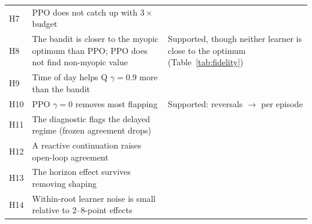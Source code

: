 \begin{table}[h]
\begin{tabular}{@{}lp{}p{}@{}}
H7 & PPO does not catch up with $3\times$ budget &  \\
H8 & The bandit is closer to the myopic optimum than PPO; PPO does not find non-myopic value & Supported, though neither learner is close to the optimum (Table~\ref{tab:fidelity}) \\
\midrule
H9 & Time of day helps Q $\gamma=0.9$ more than the bandit &  \\
H10 & PPO $\gamma=0$ removes most flapping & Supported: reversals \HPPODefaultRev{} $\rightarrow$ \HPPOZeroRev{} per episode \\
H11 & The diagnostic flags the delayed regime (frozen agreement drops) &  \\
H12 & A reactive continuation raises open-loop agreement &  \\
H13 & The horizon effect survives removing shaping &  \\
H14 & Within-root learner noise is small relative to 2--8-point effects &  \\
\bottomrule
\end{tabular}
\end{table}
